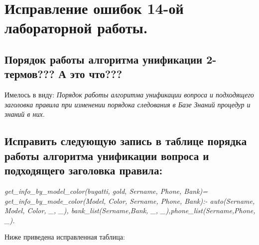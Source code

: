 \documentclass[a4paper,12pt]{article}
\begin{document}
	\section*{Исправление ошибок 14-ой лабораторной работы.}
	
	\subsection*{Порядок работы алгоритма унификации  2-термов??? А это что???}
	
	Имелось в виду: \textit{Порядок работы алгоритма унификации вопроса и подходящего заголовка правила при изменении порядока следования в Базе Знаний процедур и знаний в них.}
	
	\subsection*{Исправить следующую запись в таблице порядка работы алгоритма унификации вопроса и подходящего заголовка правила:}
	
	\textit{get\_info\_by\_model\_color(bugatti, gold, Sername, Phone, Bank)=
\linebreak
	get\_info\_by\_mode\_color(Model, Color, Sername, Phone, Bank):- {\color{red} auto(Sername,
	Model, Color, \_, \_), \linebreak bank\_list(Sername,Bank, \_, \_),phone\_list(Sername,Phone, \_).}}
	
	Ниже приведена исправленная таблица:
	
\end{document}
